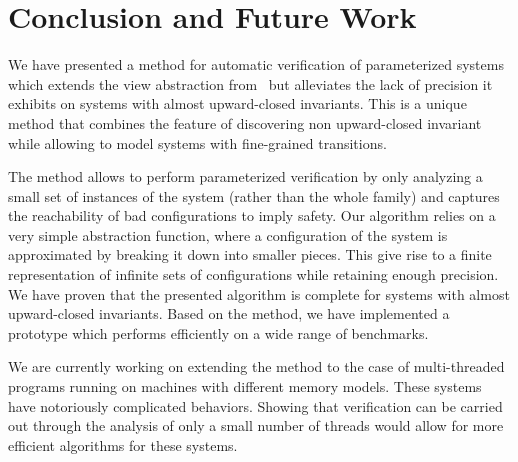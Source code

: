 \section{Conclusion and Future Work}
\label{section:conclusion}
%
We have presented a method for automatic verification of parameterized
systems which extends the view abstraction
from~\cite{AbHaHo:view:abstraction} but alleviates the lack of
precision it exhibits on systems with almost upward-closed invariants.
%
This is a unique method that combines the feature of discovering non
upward-closed invariant while allowing to model systems with
fine-grained transitions.

The method allows to perform parameterized verification by only
analyzing a small set of instances of the system (rather than the
whole family) and captures the reachability of bad configurations to
imply safety.
%
Our algorithm relies on a very simple abstraction function, where a
configuration of the system is approximated by breaking it down into
smaller pieces. This give rise to a finite representation of infinite
sets of configurations while retaining enough precision.
%
%
We have proven that the presented algorithm is complete for systems
with almost upward-closed invariants.
%
Based on the method, we have implemented a prototype which performs
efficiently on a wide range of benchmarks.
%

We are currently working on extending the method to the case of
multi-threaded programs running on machines with different memory
models.
%
These systems have notoriously complicated behaviors.
%
Showing that verification can be carried out
through the analysis of only a small number of threads
would allow for more efficient algorithms for these systems.
%
%

